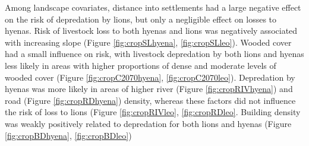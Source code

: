 \documentclass[12pt,]{article}
\begin{document}
Among landscape covariates, distance into settlements had a large negative effect on the risk of depredation by lions, but only a negligible effect on losses to hyenas. Risk of livestock loss to both hyenas and lions was negatively associated with increasing slope (Figure \ref{fig:cropSLhyena}, \ref{fig:cropSLleo}). Wooded cover had a small influence on risk, with livestock depredation by both lions and hyenas less likely in areas with higher proportions of dense and moderate levels of wooded cover (Figure \ref{fig:cropC2070hyena}, \ref{fig:cropC2070leo}). Depredation by hyenas was more likely in areas of higher river (Figure \ref{fig:cropRIVhyena}) and road (Figure \ref{fig:cropRDhyena}) density, whereas these factors did not influence the risk of loss to lions (Figure \ref{fig:cropRIVleo}, \ref{fig:cropRDleo}. Building density was weakly positively related to depredation for both lions and hyenas (Figure \ref{fig:cropBDhyena}, \ref{fig:cropBDleo})

\end{document}

